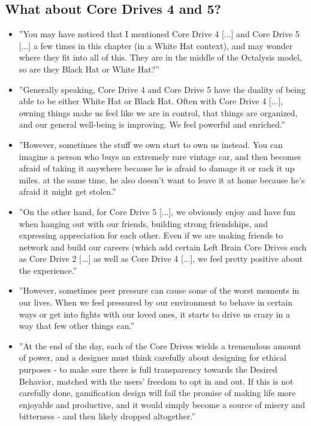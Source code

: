 \subsection{What about Core Drives 4 and 5?}
\begin{itemize}
    \item ''You may have noticed that I mentioned Core Drive 4 [...] and Core Drive 5 [...] a few times in this chapter (in a White Hat context), and may wonder where they fit into all of this. They are in the middle of the Octalysis model, so are they Black Hat or White Hat?''
    \item ''Generally speaking, Core Drive 4 and Core Drive 5 have the duality of being able to be either White Hat or Black Hat. Often with Core Drive 4 [...], owning things make us feel like we are in control, that things are organized, and our general well-being is improving. We feel powerful and enriched.''
    \item ''However, sometimes the stuff we own start to own us instead. You can imagine a person who buys an extremely rare vintage car, and then becomes afraid of taking it anywhere because he is afraid to damage it or rack it up miles. at the same time, he also doesn't want to leave it at home because he's afraid it might get stolen.''
    \item ''On the other hand, for Core Drive 5 [...], we obviously enjoy and have fun when hanging out with our friends, building strong friendships, and expressing appreciation for each other. Even if we are making friends to network and build our careers (which add certain Left Brain Core Drives such as Core Drive 2 [...] as well as Core Drive 4 [...], we feel pretty positive about the experience.''
    \item ''However, sometimes peer pressure can cause some of the worst moments in our lives. When we feel pressured by our environment to behave in certain ways or get into fights with our loved ones, it starts to drive us crazy in a way that few other things can.''
    \item ''At the end of the day, each of the Core Drives wields a tremendous amount of power, and a designer must think carefully about designing for ethical purposes - to make sure there is full transparency towards the Desired Behavior, matched with the users' freedom to opt in and out. If this is not carefully done, gamification design will fail the promise of making life more enjoyable and productive, and it would simply become a source of misery and bitterness - and then likely dropped altogether.'' 
\end{itemize}